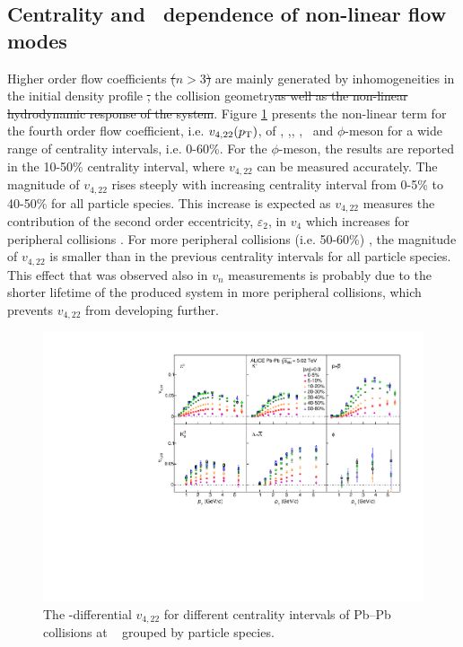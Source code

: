 \documentclass[ALICE,manyauthors]{cernphprep}
\providecommand{\DIFaddtex}[1]{{\protect\color{blue}\uwave{#1}}} %
\providecommand{\DIFdeltex}[1]{{\protect\color{red}\sout{#1}}}                      %
\providecommand{\DIFaddbegin}{} %
\providecommand{\DIFaddend}{} %
\providecommand{\DIFdelbegin}{} %
\providecommand{\DIFdelend}{} %
\providecommand{\DIFadd}[1]{\texorpdfstring{\DIFaddtex{#1}}{#1}} %
\providecommand{\DIFdel}[1]{\texorpdfstring{\DIFdeltex{#1}}{}} %
\begin{document}
\subsection{Centrality and \pT~dependence of non-linear flow modes}
\label{SubSec:pTdependence}

Higher order flow coefficients \DIFdelbegin \DIFdel{($n>3$) }\DIFdelend are mainly generated by inhomogeneities in the initial density profile \DIFdelbegin \DIFdel{, }\DIFdelend \DIFaddbegin \DIFadd{and }\DIFaddend the collision geometry\DIFdelbegin \DIFdel{as well as the non-linear hydrodynamic response of the system}\DIFdelend . Figure \ref{v422_centralityDependence} presents the non-linear term for the fourth order flow coefficient, i.e. $v_{4,22}(p_{\rm{T}})$, of \pion, \kaon,\Ks, \proton, \lambdas~and $\phi$-meson for a wide range of centrality intervals, i.e. 0-60\%. For the $\phi$-meson, the results are reported in the 10-50\% centrality interval, where $v_{4,22}$ can be measured accurately. The magnitude of $v_{4,22}$ rises steeply with increasing centrality interval from 0-5\% to 40-50\% for all particle species. This increase is expected as $v_{4,22}$ measures the contribution of the second order eccentricity, $\varepsilon_{2}$, in $v_{4}$ which increases for peripheral collisions \cite{Alver:2010gr}. For more peripheral collisions (i.e. 50-60\%) , the magnitude of $v_{4,22}$ is smaller than in the previous centrality intervals for all particle species. This effect that was observed also in $v_n$ measurements is probably due to the shorter lifetime of the produced system in more peripheral collisions, which prevents $v_{4,22}$ from developing further. 


\begin{figure}[!htb]
\begin{center}
\includegraphics[scale=0.82]{figures/results/All_v422_gap00_CentDep_PID2.pdf}
\end{center}
\caption{The \pT-differential $v_{4,22}$ for different centrality intervals of Pb--Pb collisions at \sNN~ grouped by particle species.}
\label{v422_centralityDependence}
\end{figure}
\end{document}
